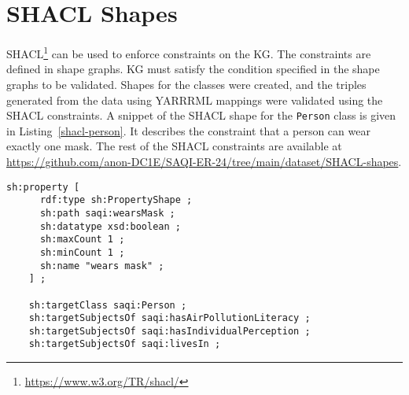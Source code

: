 \section{SHACL Shapes}
\label{sec:shacl}

SHACL\footnote{\url{https://www.w3.org/TR/shacl/}} can be used to enforce constraints on the KG. The constraints are defined in shape graphs. KG must satisfy the condition specified in the shape graphs to be validated. Shapes for the classes were created, and the triples generated from the data using YARRRML mappings were validated using the SHACL constraints. A snippet of the SHACL shape for the \texttt{Person} class is given in Listing~\ref{shacl-person}. It describes the constraint that a person can wear exactly one mask. The rest of the SHACL constraints are available at \url{https://github.com/anon-DC1E/SAQI-ER-24/tree/main/dataset/SHACL-shapes}. %

\begin{lstlisting}[label=shacl-person,caption=SHACL constraints snippet for the Person class,float,frame=tb,captionpos=b]
    sh:property [
      rdf:type sh:PropertyShape ;
      sh:path saqi:wearsMask ;
      sh:datatype xsd:boolean ;
      sh:maxCount 1 ;
      sh:minCount 1 ;
      sh:name "wears mask" ;
    ] ;

    sh:targetClass saqi:Person ;
    sh:targetSubjectsOf saqi:hasAirPollutionLiteracy ;
    sh:targetSubjectsOf saqi:hasIndividualPerception ;
    sh:targetSubjectsOf saqi:livesIn ;
\end{lstlisting}

